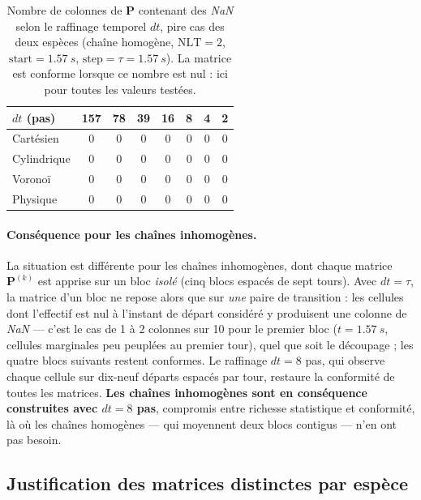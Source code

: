 \documentclass[french]{MemoireMaster}
\begin{document}
\begin{table}[H]
  \centering
  \caption{Nombre de colonnes de $\mathbf{P}$ contenant des \textit{NaN} selon le raffinage temporel $dt$, pire cas des deux espèces (chaîne homogène, $\mathrm{NLT} = 2$, $\mathrm{start} = \SI{1.57}{s}$, $\mathrm{step} = \tau = \SI{1.57}{s}$). La matrice est conforme lorsque ce nombre est nul : ici pour toutes les valeurs testées.}
  \label{tab:etude_dt}
  \begin{tabular}{lccccccc}
    \toprule
    $dt$ (pas) & 157 & 78 & 39 & 16 & 8 & 4 & 2\\
    \midrule
    Cartésien   & 0 & 0 & 0 & 0 & 0 & 0 & 0\\
    Cylindrique & 0 & 0 & 0 & 0 & 0 & 0 & 0\\
    Voronoï     & 0 & 0 & 0 & 0 & 0 & 0 & 0\\
    Physique    & 0 & 0 & 0 & 0 & 0 & 0 & 0\\
    \bottomrule
  \end{tabular}
\end{table}

\paragraph{Conséquence pour les chaînes inhomogènes.} La situation est différente pour les chaînes inhomogènes, dont chaque matrice $\mathbf{P}^{(k)}$ est apprise sur un bloc \emph{isolé} (cinq blocs espacés de sept tours). Avec $dt = \tau$, la matrice d'un bloc ne repose alors que sur \emph{une} paire de transition : les cellules dont l'effectif est nul à l'instant de départ considéré y produisent une colonne de \textit{NaN} --- c'est le cas de 1 à 2 colonnes sur 10 pour le premier bloc ($t = \SI{1.57}{s}$, cellules marginales peu peuplées au premier tour), quel que soit le découpage ; les quatre blocs suivants restent conformes. Le raffinage $dt = 8$ pas, qui observe chaque cellule sur dix-neuf départs espacés par tour, restaure la conformité de toutes les matrices. \textbf{Les chaînes inhomogènes sont en conséquence construites avec $dt = 8$ pas}, compromis entre richesse statistique et conformité, là où les chaînes homogènes --- qui moyennent deux blocs contigus --- n'en ont pas besoin.
\subsection{Justification des matrices distinctes par espèce}
\label{annexe:especes}
\end{document}
